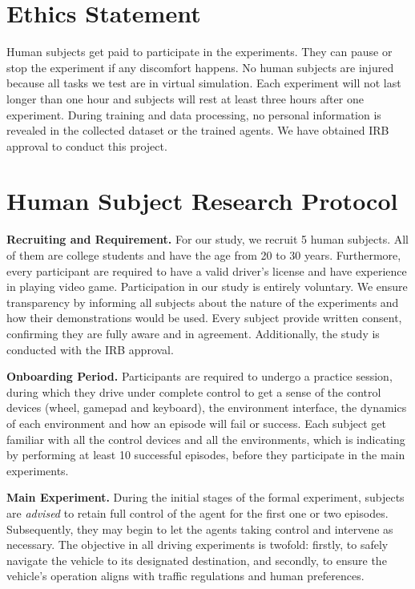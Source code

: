 
\section{Ethics Statement}
\label{section:ablation-ethics-statement}
Human subjects get paid to participate in the experiments. 
They can pause or stop the experiment if any discomfort happens. 
No human subjects are injured because all tasks we test are in virtual simulation. 
Each experiment will not last longer than one hour and subjects will rest at least three hours after one experiment. 
During training and data processing, no personal information is revealed in the collected dataset or the trained agents.
We have obtained IRB approval to conduct this project.

\section{Human Subject Research Protocol}
\label{appendix:user-study}

\textbf{Recruiting and Requirement.} 
For our study, we recruit 5 human subjects. All of them are college students and have the age from 20 to 30 years. Furthermore, every participant are required to have a valid driver's license and have experience in playing video game. Participation in our study is entirely voluntary. We ensure transparency by informing all subjects about the nature of the experiments and how their demonstrations would be used. Every subject provide written consent, confirming they are fully aware and in agreement. Additionally, the study is conducted with the IRB approval. 

\textbf{Onboarding Period.} 
Participants are required to undergo a practice session, during which they drive under complete control to get a sense of the control devices (wheel, gamepad and keyboard), the environment interface, the dynamics of each environment and how an episode will fail or success. Each subject get familiar with all the control devices and all the environments, which is indicating by performing at least 10 successful episodes, before they participate in the main experiments.

\textbf{Main Experiment.} During the initial stages of the formal experiment, subjects are \textit{advised} to retain full control of the agent for the first one or two episodes. Subsequently, they may begin to let the agents taking control and intervene as necessary. The objective in all driving experiments is twofold: firstly, to safely navigate the vehicle to its designated destination, and secondly, to ensure the vehicle's operation aligns with traffic regulations and human preferences. 

